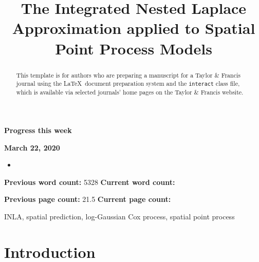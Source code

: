 \documentclass[]{interact}
\begin{document}
{\Large\bf Progress this week}

{\large\bf March 22, 2020}

\begin{itemize}

\item

\end{itemize}

\vfill

\textbf{Previous word count:} 5328 \hfill \textbf{Current word count:} 

\textbf{Previous page count:} 21.5 \hfill \textbf{Current page count:} 

\pagebreak


\title{The Integrated Nested Laplace Approximation applied to Spatial Point Process Models}

\author{
}

\maketitle

\begin{abstract}
This template is for authors who are preparing a manuscript for a Taylor \& Francis journal using the \LaTeX\ document preparation system and the \texttt{interact} class file, which is available via selected journals' home pages on the Taylor \& Francis website.
\end{abstract}

\begin{keywords}
INLA, spatial prediction, log-Gaussian Cox process, spatial point process
\end{keywords}


\section{Introduction}
\label{intro}

\end{document}
